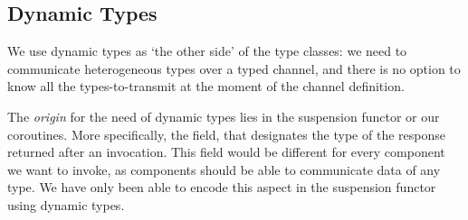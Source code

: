 \subsection{Dynamic Types}
We use dynamic types \cite{Abadi:1991:DTS:103135.103138} as `the other side' of the type classes: we need to communicate heterogeneous types over a typed channel, and there is no option to know all the types-to-transmit at the moment of the channel definition.

The \emph{origin} for the need of dynamic types lies in the suspension functor or our coroutines.
More specifically, the  field, that designates the type of the response returned after an invocation.
This field would be different for every component we want to invoke, as components should be able to communicate data of any type. %
We have only been able to encode this aspect in the suspension functor using dynamic types.




